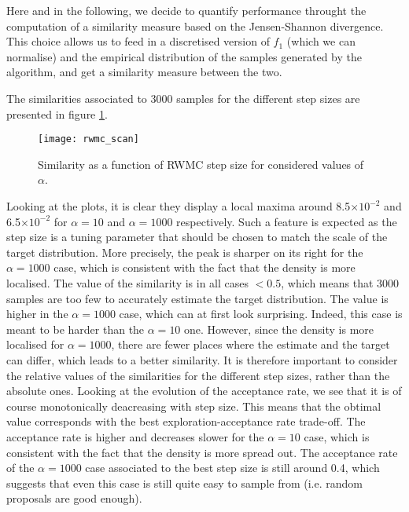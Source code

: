 \documentclass[a4paper, 12pt,oneside]{article}
\begin{document}
			Here and in the following, we decide to quantify performance throught the computation of a similarity measure based on the Jensen-Shannon divergence. This choice allows us to feed in a discretised version of $f_1$ (which we can normalise) and the empirical distribution of the samples generated by the algorithm, and get a similarity measure between the two.

			The similarities associated to 3000 samples for the different step sizes are presented in figure \ref{fig:rwmc-scan}.
			\begin{figure}[htb]
				\centering
					\vspace{0em}
					\texttt{[image: rwmc\_scan]}
					\caption{Similarity as a function of RWMC step size for considered values of $\alpha$.}
					\label{fig:rwmc-scan}
			\end{figure}
			Looking at the plots, it is clear they display a local maxima around 8.5$\times 10^{-2}$ and 6.5$\times 10^{-2}$ for $\alpha=10$ and $\alpha=1000$ respectively. Such a feature is expected as the step size is a tuning parameter that should be chosen to match the scale of the target distribution.
			More precisely, the peak is sharper on its right for the $\alpha=1000$ case, which is consistent with the fact that the density is more localised. 
			The value of the similarity is in all cases $<0.5$, which means that 3000 samples are too few to accurately estimate the target distribution. The value is higher in the $\alpha=1000$ case, which can at first look surprising. Indeed, this case is meant to be harder than the $\alpha=10$ one. However, since the density is more localised for $\alpha=1000$, there are fewer places where the estimate and the target can differ, which leads to a better similarity. It is therefore important to consider the relative values of the similarities for the different step sizes, rather than the absolute ones.
			Looking at the evolution of the acceptance rate, we see that it is of course monotonically deacreasing with step size. This means that the obtimal value corresponds with the best exploration-acceptance rate trade-off. The acceptance rate is higher and decreases slower for the $\alpha=10$ case, which is consistent with the fact that the density is more spread out. The acceptance rate of the $\alpha=1000$ case associated to the best step size is still around 0.4, which suggests that even this case is still quite easy to sample from (i.e. random proposals are good enough). 
\end{document}
